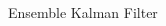 \documentclass[aspectratio=169]{beamer} %
\begin{document}
\begin{frame}{Ensemble Kalman Filter}
\begin{columns}[t]
\begin{column}{0.6\textwidth}
        \end{column}
        \begin{column}{0.4\textwidth}

            \begin{figure}[t]
                \centering

\end{figure}
\end{column}
\end{columns}
\end{frame}
\end{document}
